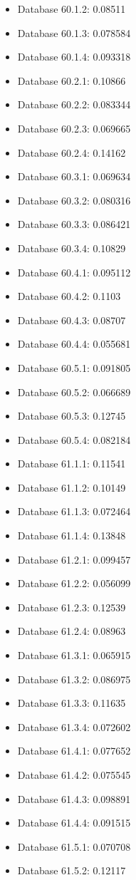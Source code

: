 \begin{itemize}
\item Database 60.1.2: 0.08511
\item Database 60.1.3: 0.078584
\item Database 60.1.4: 0.093318
\item Database 60.2.1: 0.10866
\item Database 60.2.2: 0.083344
\item Database 60.2.3: 0.069665
\item Database 60.2.4: 0.14162
\item Database 60.3.1: 0.069634
\item Database 60.3.2: 0.080316
\item Database 60.3.3: 0.086421
\item Database 60.3.4: 0.10829
\item Database 60.4.1: 0.095112
\item Database 60.4.2: 0.1103
\item Database 60.4.3: 0.08707
\item Database 60.4.4: 0.055681
\item Database 60.5.1: 0.091805
\item Database 60.5.2: 0.066689
\item Database 60.5.3: 0.12745
\item Database 60.5.4: 0.082184
\item Database 61.1.1: 0.11541
\item Database 61.1.2: 0.10149
\item Database 61.1.3: 0.072464
\item Database 61.1.4: 0.13848
\item Database 61.2.1: 0.099457
\item Database 61.2.2: 0.056099
\item Database 61.2.3: 0.12539
\item Database 61.2.4: 0.08963
\item Database 61.3.1: 0.065915
\item Database 61.3.2: 0.086975
\item Database 61.3.3: 0.11635
\item Database 61.3.4: 0.072602
\item Database 61.4.1: 0.077652
\item Database 61.4.2: 0.075545
\item Database 61.4.3: 0.098891
\item Database 61.4.4: 0.091515
\item Database 61.5.1: 0.070708
\item Database 61.5.2: 0.12117

\end{itemize}
